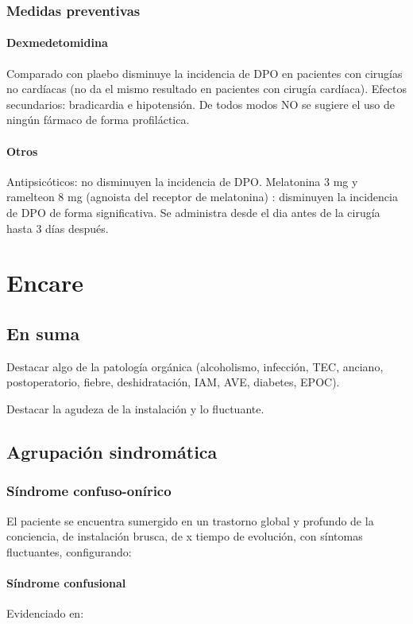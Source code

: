 \subsubsection*{Medidas preventivas}
\paragraph{Dexmedetomidina}
Comparado con plaebo disminuye la incidencia de DPO en pacientes con cirugías no cardíacas (no da el mismo resultado en pacientes con cirugía cardíaca). Efectos secundarios: bradicardia e hipotensión.
De todos modos NO se sugiere el uso de ningún fármaco de forma profiláctica.
\paragraph{Otros}
Antipsicóticos: no disminuyen la incidencia de DPO. Melatonina 3 mg y ramelteon 8 mg (agnoista del receptor de melatonina) : disminuyen la incidencia de DPO de forma significativa. Se administra desde el dia antes de la cirugía hasta 3 días después.
\section*{Encare}
\subsection*{En suma}
Destacar algo de la patología orgánica (alcoholismo, infección, TEC, anciano, postoperatorio, fiebre, deshidratación, IAM, AVE, diabetes, EPOC).

Destacar la agudeza de la instalación y lo fluctuante.

\subsection*{Agrupación sindromática}
\subsubsection*{Síndrome confuso-onírico}

El paciente se encuentra sumergido en un trastorno global y profundo de la conciencia, de instalación brusca, de x tiempo de evolución, con síntomas fluctuantes, configurando:

\paragraph{Síndrome confusional}
Evidenciado en:

